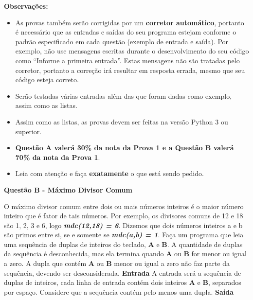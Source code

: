 \documentclass[a4paper, 12pt]{article}
\begin{document}
\textbf{{\large Observações:}}
\begin{itemize}
	\item As provas também serão corrigidas por um \textbf{corretor automático}, portanto é necessário que as entradas e saídas do seu programa estejam conforme o padrão especificado em cada questão (exemplo de entrada e saída). Por exemplo, não use mensagens escritas durante o desenvolvimento do seu código como “Informe a primeira entrada”. Estas mensagens não são tratadas pelo corretor, portanto a correção irá resultar em resposta errada, mesmo que seu código esteja correto.
	\item Serão testadas várias entradas além das que foram dadas como exemplo, assim como as listas.
	\item Assim como as listas, as provas devem ser feitas na versão Python 3 ou superior.
	\item \textbf{Questão A valerá 30\% da nota da Prova 1 e a Questão B valerá 70\% da nota da Prova 1}.
	\item Leia com atenção e faça \textbf{exatamente} o que está sendo pedido.
\end{itemize}
\newpage %
\begin{center}
\textbf{{\Large Questão B - Máximo Divisor Comum}}
\end{center}
\vspace{5pt}
O máximo divisor comum entre dois ou mais números inteiros é o maior número inteiro que é fator de tais números. Por exemplo, os divisores comuns de 12 e 18 são 1, 2, 3 e 6, logo \textbf{\textit{mdc(12,18) = 6}}. Dizemos que dois números inteiros a e b são primos entre si, se e somente se \textbf{\textit{mdc(a,b) = 1}}. Faça um programa que leia uma sequência de duplas de inteiros do teclado, \textbf{A} e \textbf{B}. A quantidade de duplas da sequência é desconhecida, mas ela termina quando \textbf{A} ou \textbf{B} for menor ou igual a zero. A dupla que contém \textbf{A} ou \textbf{B} menor ou igual a zero não faz parte da sequência, devendo ser desconsiderada.
\newline \newline
\textbf{{\large Entrada}} \newline
A entrada será a sequência de duplas de inteiros, cada linha de entrada contém dois inteiros \textbf{A} e \textbf{B}, separados por espaço. Considere que a sequência contém pelo menos uma dupla.
\newline \newline
\textbf{{\large Saída}} \newline
\end{document}

